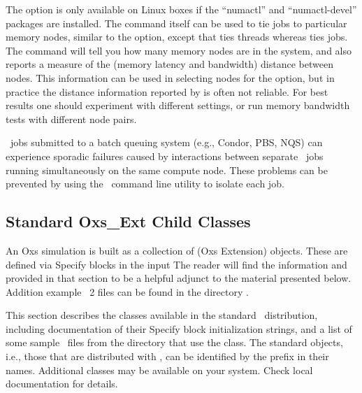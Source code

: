 The  option is only available on Linux boxes if the
``numactl'' and ``numactl-devel'' packages are installed.  The
 command itself can be used to tie jobs to particular memory
nodes, similar to the  option, except that
 ties threads whereas  ties jobs.  The
 command will tell you how many memory nodes are
in the system, and also reports a measure of the (memory latency and
bandwidth) distance between nodes.  This information can be used in
selecting nodes for the  option, but in
practice the distance information reported by  is often not
reliable.  For best results one should experiment with different
settings, or run memory bandwidth tests with different node
pairs.

\OOMMF\ jobs submitted to a batch queuing system (e.g., Condor, PBS,
NQS) can experience sporadic failures caused by interactions between
separate \OOMMF\ jobs running simultaneously on the same compute
node.  These problems can be prevented by using the \OOMMF\ command
line utility
to isolate each job.



\subsection{Standard Oxs\_Ext Child Classes}\label{sec:oxsext}%
An Oxs simulation is built as a collection of  (Oxs
Extension) objects.  These are defined via Specify blocks in the input
The reader will find the information and
 provided in that section to be a helpful
adjunct to the material presented below.  Addition example \MIF~2
files can be found in the directory .

This section describes the  classes available in the
standard \OOMMF\ distribution, including documentation of their Specify
block initialization strings, and a list of some sample \MIF\ files from
the  directory that use the class.  The
standard  objects, i.e., those that are distributed with
\OOMMF, can be identified by the  prefix in their names.
Additional  classes may be available on your system.  Check
local documentation for details.

